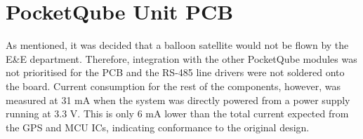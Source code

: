 \section{PocketQube Unit PCB}

As mentioned, it was decided that a balloon satellite would not be flown by the E\&E department. Therefore, integration with the other PocketQube modules was not prioritised for the PCB and the RS-485 line drivers were not soldered onto the board. Current consumption for the rest of the components, however, was measured at 31 mA when the system was directly powered from a power supply running at 3.3 V. This is only 6 mA lower than the total current expected from the GPS and MCU ICs, indicating conformance to the original design.